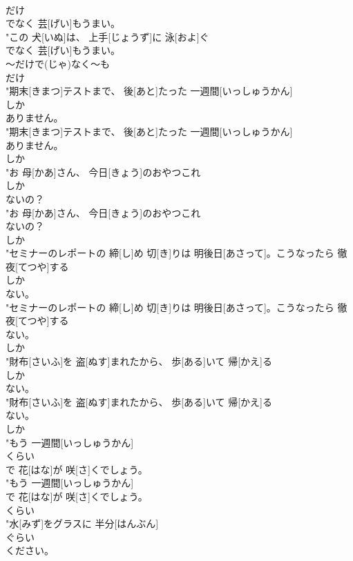 \documentclass[8pt]{extreport}
\begin{document}
\begin{CJK}{UTF8}{min}
\\	だけ
\\	でなく 芸[げい]もうまい。
\\	"この 犬[いぬ]は、 上手[じょうず]に 泳[およ]ぐ
\\	でなく 芸[げい]もうまい。
\\	～だけで(じゃ)なく～も	
\\	だけ
\\	"期末[きまつ]テストまで、 後[あと]たった 一週間[いっしゅうかん]
\\	しか
\\	ありません。
\\	"期末[きまつ]テストまで、 後[あと]たった 一週間[いっしゅうかん]
\\	ありません。
\\	しか
\\	"お 母[かあ]さん、 今日[きょう]のおやつこれ
\\	しか
\\	ないの？
\\	"お 母[かあ]さん、 今日[きょう]のおやつこれ
\\	ないの？
\\	しか
\\	"セミナーのレポートの 締[し]め 切[き]りは 明後日[あさって]。こうなったら 徹夜[てつや]する
\\	しか
\\	ない。
\\	"セミナーのレポートの 締[し]め 切[き]りは 明後日[あさって]。こうなったら 徹夜[てつや]する
\\	ない。
\\	しか
\\	"財布[さいふ]を 盗[ぬす]まれたから、 歩[ある]いて 帰[かえ]る
\\	しか
\\	ない。
\\	"財布[さいふ]を 盗[ぬす]まれたから、 歩[ある]いて 帰[かえ]る
\\	ない。
\\	しか
\\	"もう 一週間[いっしゅうかん]
\\	くらい
\\	で 花[はな]が 咲[さ]くでしょう。
\\	"もう 一週間[いっしゅうかん]
\\	で 花[はな]が 咲[さ]くでしょう。
\\	くらい
\\	"水[みず]をグラスに 半分[はんぶん]
\\	ぐらい
\\	ください。

\end{CJK}
\end{document}
